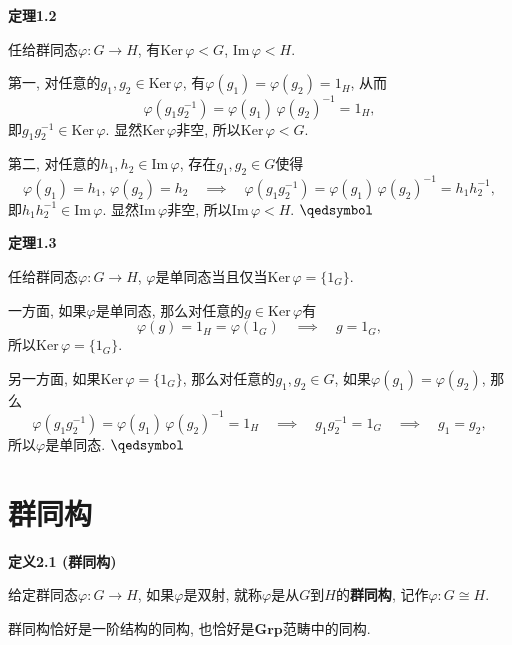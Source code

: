 \documentclass[UTF8]{ctexart}
\begin{document}
\hypertarget{sec:定理1.2}{}
\noindent\textbf{定理1.2}

任给群同态$\varphi:G\to H$, 有$\mathrm{Ker}\,\varphi<G$, $\mathrm{Im}\,\varphi<H$.


第一, 对任意的$g_1,g_2\in\mathrm{Ker}\,\varphi$,
有$\varphi(g_1)=\varphi(g_2)=1_H$, 从而
\[
    \varphi(g_1g_2^{-1})=\varphi(g_1)\,\varphi(g_2)^{-1}=1_H,
\]
即$g_1g_2^{-1}\in\mathrm{Ker}\,\varphi$.
显然$\mathrm{Ker}\,\varphi$非空, 所以$\mathrm{Ker}\,\varphi<G$.

第二, 对任意的$h_1,h_2\in\mathrm{Im}\,\varphi$, 存在$g_1,g_2\in G$使得
\[
    \varphi(g_1)=h_1,\,\varphi(g_2)=h_2\quad\implies\quad
    \varphi(g_1g_2^{-1})=\varphi(g_1)\,\varphi(g_2)^{-1}=h_1h_2^{-1},
\]
即$h_1h_2^{-1}\in\mathrm{Im}\,\varphi$.
显然$\mathrm{Im}\,\varphi$非空, 所以$\mathrm{Im}\,\varphi<H$.
\hfill $\qedsymbol$

\vspace{10pt}

\hypertarget{sec:定理1.3}{}
\noindent\textbf{定理1.3}

任给群同态$\varphi:G\to H$, $\varphi$是单同态当且仅当$\mathrm{Ker}\,\varphi=\{1_G\}$.


一方面, 如果$\varphi$是单同态, 那么对任意的$g\in\mathrm{Ker}\,\varphi$有
\[
    \varphi(g)=1_H=\varphi(1_G)\quad\implies\quad g=1_G,
\]
所以$\mathrm{Ker}\,\varphi=\{1_G\}$.

另一方面, 如果$\mathrm{Ker}\,\varphi=\{1_G\}$, 那么对任意的$g_1,g_2\in G$,
如果$\varphi(g_1)=\varphi(g_2)$, 那么
\[
    \varphi(g_1g_2^{-1})=\varphi(g_1)\,\varphi(g_2)^{-1}=1_H\quad\implies\quad
    g_1g_2^{-1}=1_G\quad\implies\quad g_1=g_2,
\]
所以$\varphi$是单同态. \hfill $\qedsymbol$





\newpage

\section{群同构}

\hypertarget{sec:定义2.1}{}
\noindent\textbf{定义2.1 (群同构)}

给定群同态$\varphi:G\to H$, 如果$\varphi$是双射,
就称$\varphi$是从$G$到$H$的\textbf{群同构}, 记作$\varphi:G\cong H$.

\vspace{10pt}

群同构恰好是一阶结构的同构, 也恰好是$\mathbf{Grp}$范畴中的同构.
\end{document}
